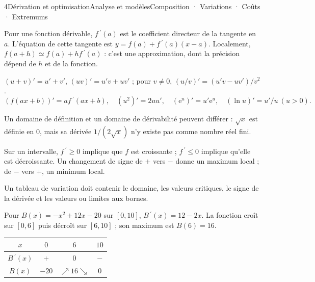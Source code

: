 \begin{ouverture}[derivation]{4}{Dérivation et optimisation}{Analyse et modèles}{Composition · Variations · Coûts · Extremums}
\end{ouverture}
\essentiel

Pour une fonction dérivable, $f\,\!^{\prime}(a)$ est le coefficient directeur de la tangente en $a$.
L'équation de cette tangente est $y=f(a)+f\,\!^{\prime}(a)(x-a)$.
Localement, $f(a+h)\simeq f(a)+hf\,\!^{\prime}(a)$ : c'est une approximation, dont la précision dépend de $h$ et de la fonction.
\begin{propriete}
$(u+v)'=u'+v'$, $(uv)'=u'v+uv'$ ; pour $v\ne0$,
$(u/v)'=(u'v-uv')/v^2$.
\[(f(ax+b))'=af\,\!^{\prime}(ax+b),\quad (u^2)'=2uu',\quad(\mathrm e^u)'=u'\mathrm e^u,\quad(\ln u)'=u'/u\ (u>0).\]
\end{propriete}
Un domaine de définition et un domaine de dérivabilité peuvent différer : $\sqrt x$ est définie en $0$, mais sa dérivée $1/(2\sqrt x)$ n'y existe pas comme nombre réel fini.
\begin{theoreme}[Admis]
Sur un intervalle, $f\,\!^{\prime}\geq0$ implique que $f$ est croissante ; $f\,\!^{\prime}\leq0$ implique qu'elle est décroissante.
Un changement de signe de $+$ vers $-$ donne un maximum local ; de $-$ vers $+$, un minimum local.
\end{theoreme}
Un tableau de variation doit contenir le domaine, les valeurs critiques, le signe de la dérivée et les valeurs ou limites aux bornes.
\begin{exemple}[Production]
Pour $B(x)=-x^2+12x-20$ sur $[0,10]$, $B\,\!^{\prime}(x)=12-2x$.
La fonction croît sur $[0,6]$ puis décroît sur $[6,10]$ ; son maximum est $B(6)=16$.
\begin{center}\begin{tabular}{c|ccc}$x$&$0$&$6$&$10$\\\hline
$B\,\!^{\prime}(x)$&$+$&$0$&$-$\\$B(x)$&$-20$&$\nearrow16\searrow$&$0$\end{tabular}\end{center}
\end{exemple}

